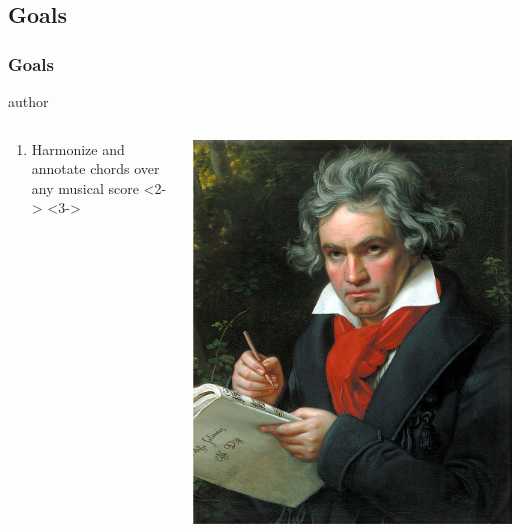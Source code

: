 \documentclass[english]{beamer}
\begin{document}
\subsection{Goals}
	\begin{frame}
		\frametitle{Goals}
			\begin{beamercolorbox}[leftskip=8cm,center,wd=0.7\textwidth]{author}
			\begin{columns}[T]
			\begin{column}{.60\textwidth}%
				\begin{enumerate}
					\item \alert{Harmonize} and annotate chords over any musical score
					<2->
					<3->
				\end{enumerate}
			\end{column}
			\begin{column}{.39\textwidth}%
			\includegraphics[width=\linewidth]{imagenes/Beethoven.jpg}
			\end{column}
			\end{columns}
			\end{beamercolorbox}
	\end{frame}
\end{document}
